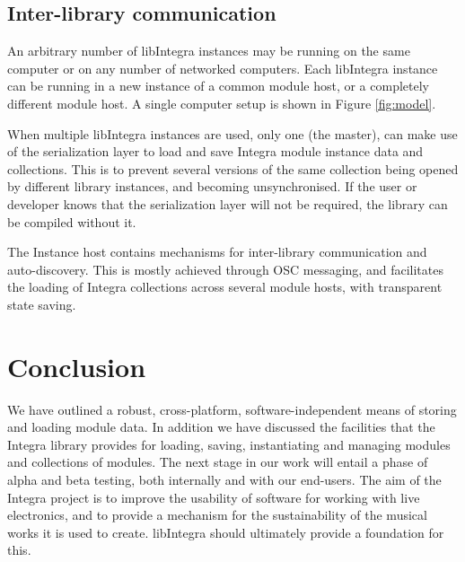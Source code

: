 \documentclass{article}
\begin{document}
\subsection{Inter-library communication}\label{subsec:interlib}

An arbitrary number of libIntegra instances may be running on the same computer or on any number of networked computers. Each libIntegra instance can be running in a new instance of a common module host, or a completely different module host. A single computer
setup is shown in Figure \ref{fig:model}. 

When multiple libIntegra instances are used, only one (the master), can make use of the serialization layer to load and save Integra module instance data and collections. This is to prevent several versions of the same collection being opened by different library instances, and becoming unsynchronised. If the user or developer knows that the serialization layer will not be required, the library can be compiled without it.

The Instance host contains mechanisms for inter-library communication and auto-discovery. This is mostly achieved through OSC messaging, and facilitates the loading of Integra collections across several module hosts, with transparent state saving.


\section{Conclusion}\label{sec:conclusion}

We have outlined a robust, cross-platform, software-in\-dependent means of storing and loading module data. In addition we have discussed the facilities that the Integra library provides for loading, saving, instantiating and managing modules and collections of modules. The next stage in our work will entail a phase of alpha and beta testing, both internally and with our end-users. The aim of the Integra project is to improve the usability of software for working with live electronics, and to provide a mechanism for the sustainability of the musical works it is used to create. libIntegra should ultimately provide a foundation for this.
\end{document}
